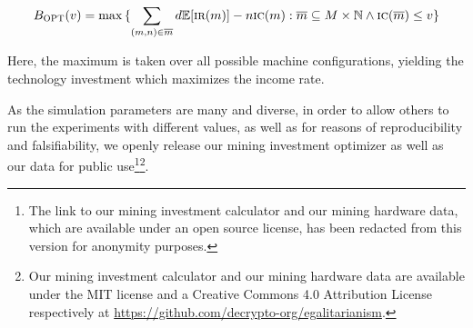 \[
  B_\textsc{OPT}(v)
  =
  \max{
    \{
      \sum_{(m, n) \in \overline{m}}
      {d\mathbb{E}[\textsc{ir}(m)] - n\textsc{ic}(m)}:
      \overline{m} \subseteq M \times \mathbb{N}
      \land
      \textsc{ic}(\overline{m}) \leq v
    \}
  }
\]

Here, the maximum is taken over all possible machine configurations, yielding
the technology investment which maximizes the income rate.

As the simulation parameters are many and diverse, in order to allow others to
run the experiments with different values, as well as for reasons of
reproducibility and falsifiability, we openly release our mining investment
optimizer as well as our data for public use\ifanonymous\footnote{
  The link to our mining investment calculator and our mining hardware data,
  which are available under an open source license, has been redacted from this
  version for anonymity purposes.
}\else\footnote{
  Our mining investment calculator and our mining hardware data are available
  under the MIT license and a Creative Commons 4.0 Attribution License
  respectively at \url{https://github.com/decrypto-org/egalitarianism}.
}\fi.

